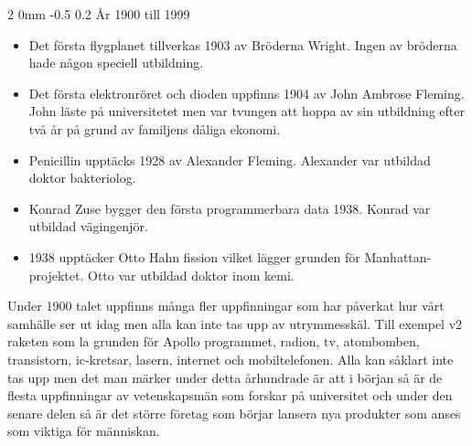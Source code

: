 \documentclass[a4paper,12pt]{article}
\makeatletter
\renewcommand{\subsection}{\@startsection
   {subsection}%
   {2}%
   {0mm}%
   {-0.5\baselineskip}%
   {0.2\baselineskip}%
   {\rmfamily\normalfont\slshape\normalsize}}%
\makeatother
\begin{document}
\subsection{År 1900 till 1999}
\begin{itemize}
\item Det första flygplanet tillverkas 1903 av Bröderna Wright.\cite{wright} Ingen av bröderna hade någon speciell utbildning.\cite{wright-life}

\item Det första elektronröret och dioden uppfinns 1904 av John Ambrose Fleming.\cite{ambrose} John läste på universitetet men var tvungen att hoppa av sin utbildning efter två år på grund av familjens dåliga ekonomi.\cite{ambrose-life}

\item Penicillin upptäcks 1928 av Alexander Fleming.\cite{penicillin} Alexander var utbildad doktor bakteriolog.\cite{fleming-life}

\item Konrad Zuse bygger den första programmerbara data 1938.\cite{zuse} Konrad var utbildad vägingenjör.\cite{zuse-life} 

\item 1938 upptäcker Otto Hahn fission vilket lägger grunden för Manhattan-projektet.\cite{fission} Otto var utbildad doktor inom kemi.\cite{hahn-life}
\end{itemize}
\noindent
Under 1900 talet uppfinns många fler uppfinningar som har påverkat hur vårt samhälle ser ut idag men alla kan inte tas upp av utrymmesskäl. Till exempel v2 raketen som la grunden för Apollo programmet, radion, tv, atombomben, transistorn, ic-kretsar, lasern, internet och mobiltelefonen. Alla kan såklart  inte tas upp men det man märker under detta århundrade är att i början så är de flesta uppfinningar av vetenskapsmän som forskar på universitet och under den senare delen så är det större företag som börjar lansera nya produkter som anses som viktiga för människan. 
\end{document}
